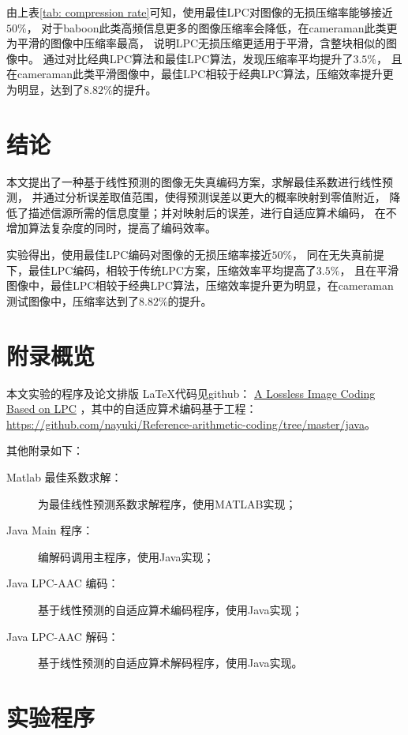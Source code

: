 \documentclass[12pt,a4paper]{article}%
\begin{document}
由上表\ref{tab: compression rate}可知，使用最佳LPC对图像的无损压缩率能够接近$50\%$，
对于baboon此类高频信息更多的图像压缩率会降低，在cameraman此类更为平滑的图像中压缩率最高，
说明LPC无损压缩更适用于平滑，含整块相似的图像中。
通过对比经典LPC算法和最佳LPC算法，发现压缩率平均提升了$3.5\%$，
且在cameraman此类平滑图像中，最佳LPC相较于经典LPC算法，压缩效率提升更为明显，达到了$8.82\%$的提升。


\section{结论}
本文提出了一种基于线性预测的图像无失真编码方案，求解最佳系数进行线性预测，
并通过分析误差取值范围，使得预测误差以更大的概率映射到零值附近，
降低了描述信源所需的信息度量；并对映射后的误差，进行自适应算术编码，
在不增加算法复杂度的同时，提高了编码效率。

实验得出，使用最佳LPC编码对图像的无损压缩率接近$50\%$，
同在无失真前提下，最佳LPC编码，相较于传统LPC方案，压缩效率平均提高了$3.5\%$，
且在平滑图像中，最佳LPC相较于经典LPC算法，压缩效率提升更为明显，在cameraman测试图像中，压缩率达到了$8.82\%$的提升。





\clearpage
\appendix
\section{附录概览}
本文实验的程序及论文排版 \LaTeX 代码见github：
\href{https://github.com/nayuki/Reference-arithmetic-coding/tree/master/java}{A Lossless Image Coding Based on LPC}
，其中的自适应算术编码基于工程：
\href{https://github.com/nayuki/Reference-arithmetic-coding/tree/master/java}
{https://github.com/nayuki/Reference-arithmetic-coding/tree/master/java}。

其他附录如下：
\begin{description}
    \item[Matlab 最佳系数求解：] 为最佳线性预测系数求解程序，使用MATLAB实现；
    \item[Java Main 程序：] 编解码调用主程序，使用Java实现；
    \item[Java LPC-AAC 编码：] 基于线性预测的自适应算术编码程序，使用Java实现；
    \item[Java LPC-AAC 解码：] 基于线性预测的自适应算术解码程序，使用Java实现。
\end{description}

\section{实验程序}




\end{document}
